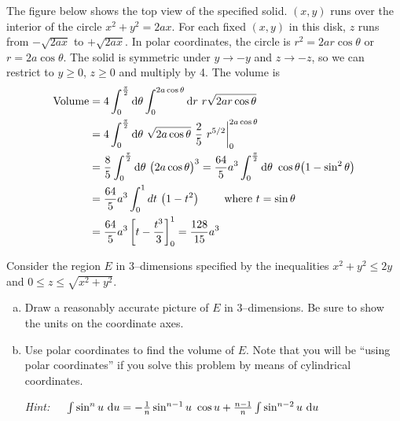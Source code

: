 \begin{solution}
The figure below shows the top view of the specified solid.
$(x,y)$ runs over the interior of the circle $x^2+y^2=2ax$. For each fixed
$(x,y)$ in this disk, $z$ runs from $-\sqrt{2ax}$ to $+\sqrt{2ax}$. In polar
coordinates, the circle is $r^2=2ar\cos\theta$ or $r=2a\cos\theta$. 
%
The solid
is symmetric under $y\rightarrow -y$ and $z\rightarrow -z$, so we can restrict
to $y\ge 0$, $z\ge 0$ and multiply by 4. The volume is
\begin{align*}
\text{Volume}
&=4\int_0^{\pi\over 2} \dee{\theta}\int_0^{2a\cos\theta} \dee{r}\  
                                                r\sqrt{2ar\cos\theta}
\\
&=4\int_0^{\pi\over 2} \dee{\theta}\ \sqrt{2a\cos\theta}\ \frac{2}{5}\ 
                                 r^{5/2}\bigg|_0^{2a\cos\theta}
\\
&=\frac{8}{5}\int_0^{\pi\over 2} \dee{\theta}\ \big(2a\cos\theta\big)^3
=\frac{64}{5}a^3\int_0^{\pi\over 2} \dee{\theta}\ \cos\theta\big(1-\sin^2\theta\big)\cr
&=\frac{64}{5}a^3\int_0^1 dt\ \big(1-t^2\big)
\qquad\text{ where $t=\sin\theta$}\cr
&=\frac{64}{5}a^3\left[t-\frac{t^3}{3}\right]_0^1
=\frac{128}{15}a^3
\end{align*}
\end{solution}


\begin{question}[M200 2005D] %
Consider  the region $E$ in 3--dimensions specified by the inequalities 
$x^2 + y^2 \le 2y$ and $0 \le z \le \sqrt{x^2 + y^2}$.
\begin{enumerate}[(a)]
\item
  Draw a reasonably accurate picture of $E$ in 3--dimensions. 
Be sure to show the units on the coordinate axes.
\item 
  Use polar coordinates to find the volume of $E$. Note that you will 
  be ``using polar coordinates'' if you solve this problem
 by means of cylindrical coordinates. 

 \emph{Hint:}\ \ \ 
    $\int \sin^n u\ \mathrm{d}u =-\frac{1}{n}\sin^{n-1}u\ \cos u
                 +\frac{n-1}{n}\int\sin^{n-2}u\ \mathrm{d}u$
\end{enumerate}
\end{question}

%


